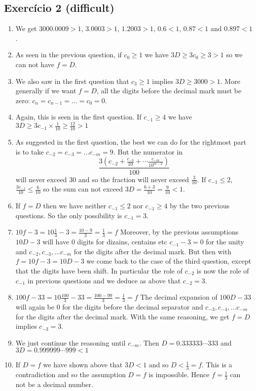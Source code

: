\subsection*{Exercício 2 (difficult)}

\begin{enumerate}
\item We get $3000.0009 > 1$, $3.0003 > 1$, $1.2003 > 1$,
  $0.6<1$, $0.87<1$ and $0.897 < 1$.
\item As seen in the previous question, if $c_0 \geq 1$
  we have $3D \geq 3c_0 \geq 3 > 1$ so we can not have $f=D$.
\item We also saw in the first question
  that $c_{3} \geq 1$ implies $3D \geq 3000 > 1$. More generally
  if we want $f=D$, all the digits before the decimal mark must be zero:
  $c_n = c_{n-1} = \ldots = c_{0} = 0$.
\item Again, this is seen in the first question.
  If $c_{-1} \geq 4$ we have
  $3D \geq 3c_{-1} \times \frac{1}{10} \geq \frac{12}{10} > 1$
\item
  As suggested in the first question,
  the best we can do for the rightmost part is to take
  $c_{-2} = c_{-3} = \dots c_{-m} = 9$. But the numerator in
  $$
  \frac{3 \left(c_{-2} + \frac{c_{-3}}{10} + \cdots \frac{c_{-m}}{10^{m-2}}\right)}{100}
  $$
  will never exceed $30$ and so the fraction will never exceed $\frac{3}{10}$.
  If $c_{-1} \leq 2$, $\frac{3 c_{-1}}{10} \leq \frac{6}{10}$ so
  the sum can not exceed $3D=\frac{6+3}{10}=\frac{9}{10}<1$.

\item If $f=D$ then we have neither $c_{-1} \leq 2$ nor $c_{-1} \geq 4$ by
  the two previous questions. So the only possibility is $c_{-1}=3$.

\item $10f-3=10 \frac{1}{3} - 3 = \frac{10-9}{3} = \frac{1}{3}=f$
  Moreover, by the previous assumptions
  $10D - 3$ will have $0$ digits for dizains, centains etc
  $c_{-1} - 3 = 0$ for the unity and
  $c_{-2}, c_{-3}, \dots c_{-m}$ for the digits after the decimal mark.
  But then with $f=10f-3=10D - 3$ we come back to the case of the third
  question, except that the digits have been shift. In particular the role
  of $c_{-2}$ is now the role of $c_{-1}$ in previous questions and
  we deduce as above that $c_{-2} = 3$.

\item
  $100f-33=10 \frac{100}{3} - 33 = \frac{100-99}{3} = \frac{1}{3}=f$
  The decimal expansion of $100D - 33$
  will again be 0 for the digits before the decimal separator and
  $c_{-3}, c_{-4}, \dots c_{-m}$ for the digits after the decimal mark.
  With the same reasoning, we get $f=D$ implies $c_{-3} = 3$.

\item We just continue the reasoning until $c_{-m}$. Then
  $D = 0.333333 \cdots 333$ and
  $3D = 0.999999 \cdots 999 < 1$

\item If $D=f$ we have shown above that $3D < 1$ and
  so $D < \frac{1}{3} = f$. This is a contradiction and so the assumption
  $D=f$ is impossible. Hence $f = \frac{1}{3}$ can not be a decimal number.

\end{enumerate}

